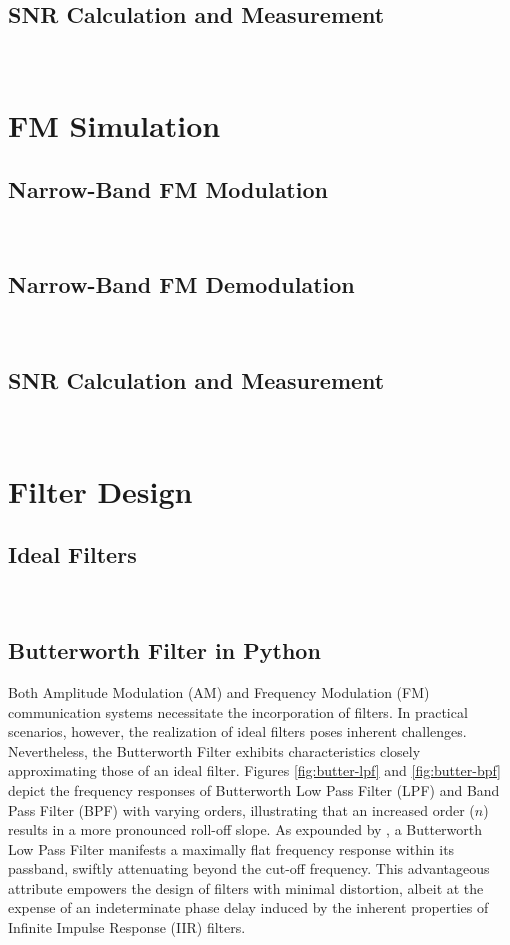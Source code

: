 \documentclass[../ECE459FinalProjectReport.tex]{subfiles}
\begin{document}
\subsection{SNR Calculation and Measurement}
~
\section{FM Simulation}
\subsection{Narrow-Band FM Modulation}
~
\subsection{Narrow-Band FM Demodulation}
~
\subsection{SNR Calculation and Measurement}
~
\section{Filter Design}
\subsection{Ideal Filters}
~
\subsection{Butterworth Filter in Python}

Both Amplitude Modulation (AM) and Frequency Modulation (FM) communication systems necessitate the incorporation of filters. In practical scenarios, however, the realization of ideal filters poses inherent challenges. Nevertheless, the Butterworth Filter exhibits characteristics closely approximating those of an ideal filter. Figures \ref{fig:butter-lpf} and \ref{fig:butter-bpf} depict the frequency responses of Butterworth Low Pass Filter (LPF) and Band Pass Filter (BPF) with varying orders, illustrating that an increased order ($n$) results in a more pronounced roll-off slope. As expounded by \cite{storrButterworthFilterDesign2013, kudekiAnalogSignalsSystems2009}, a Butterworth Low Pass Filter manifests a maximally flat frequency response within its passband, swiftly attenuating beyond the cut-off frequency. This advantageous attribute empowers the design of filters with minimal distortion, albeit at the expense of an indeterminate phase delay induced by the inherent properties of Infinite Impulse Response (IIR) filters.
\end{document}
